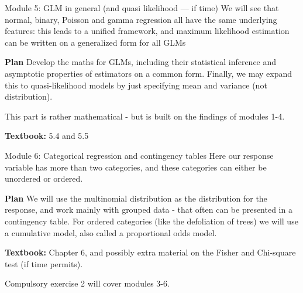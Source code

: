 \documentclass[
  ignorenonframetext,
]{beamer}
\begin{document}
\begin{frame}
\begin{block}{Module 5: GLM in general (and quasi likelihood --- if
time)}
\protect\hypertarget{module-5-glm-in-general-and-quasi-likelihood-if-time}{}
We will see that normal, binary, Poisson and gamma regression all have
the same underlying features: this leads to a unified framework, and
maximum likelihood estimation can be written on a generalized form for
all GLMs

\textbf{Plan} Develop the maths for GLMs, including their statistical
inference and asymptotic properties of estimators on a common form.
Finally, we may expand this to quasi-likelihood models by just
specifying mean and variance (not distribution).

This part is rather mathematical - but is built on the findings of
modules 1-4.

\textbf{Textbook:} 5.4 and 5.5
\end{block}
\end{frame}

\begin{frame}
\begin{block}{Module 6: Categorical regression and contingency tables}
\protect\hypertarget{module-6-categorical-regression-and-contingency-tables}{}
Here our response variable has more than two categories, and these
categories can either be unordered or ordered.

\textbf{Plan} We will use the multinomial distribution as the
distribution for the response, and work mainly with grouped data - that
often can be presented in a contingency table. For ordered categories
(like the defoliation of trees) we will use a cumulative model, also
called a proportional odds model.

\textbf{Textbook:} Chapter 6, and possibly extra material on the Fisher
and Chi-square test (if time permits).

Compulsory exercise 2 will cover modules 3-6.
\end{block}
\end{frame}
\end{document}
